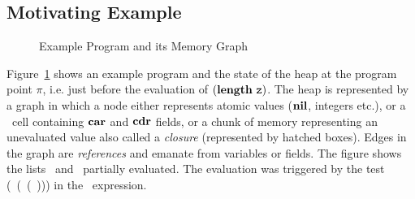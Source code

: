\documentclass[9pt]{sigplanconf}
\begin{document}
\subsection{Motivating Example}
\label{sec:motiv}
\begin{figure}[t!]
  \vspace*{-3ex}
  \caption{Example Program and its Memory Graph}\label{fig:mot-example}
\end{figure}

Figure~\ref{fig:mot-example} shows an example program and the state of
the heap at  the program point $\pi$, i.e. just  before the evaluation
of $(\mathbf{length}\  \mbox{\tt z})$.  The heap is  represented by a graph  in which a
node either  represents atomic  values ($\mbox{$\mathbf{ nil}$}$,  integers etc.),  or a
\CONS\ cell containing $\mbox{$\mathbf{car}$}$ and $\mbox{$\mathbf{cdr}$}$  fields, or a chunk of memory
representing  an  unevaluated  value   also  called  a  {\em  closure}
(represented  by  hatched  boxes).   Edges   in  the  graph  are  {\em
  references} and emanate from variables  or fields.  The figure shows
the  lists \px\  and  \pz\ partially  evaluated.   The evaluation  was
triggered    by   the    test   (\NULLQ~(\CAR~(\CDR~\pz)))    in   the
\SIF\ expression.
\end{document}
